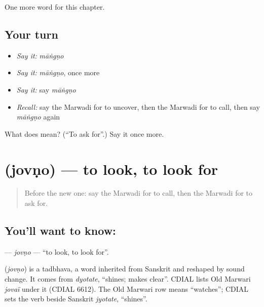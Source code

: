 \begin{grammarlens}[title={What you've built}]
One more word for this chapter.
\end{grammarlens}

\subsection*{Your turn}
\begin{itemize}
\raggedright
  \item \emph{Say it:} \emph{māṅgṇo}
  \item \emph{Say it:} \emph{māṅgṇo}, once more
  \item \emph{Say it:} say \emph{māṅgṇo}
  \item \emph{Recall:} say the Marwadi for to uncover, then the Marwadi for to call, then say \emph{māṅgṇo} again
\end{itemize}

\begin{tcolorbox}[breakable,colback=teal!4,colframe=teal!35!black,title={Before you move on}]
What does  mean? (\textquotedblleft{}To ask for\textquotedblright{}.) Say it once more.
\end{tcolorbox}
\section[\texorpdfstring{\mw{जोवणो} (jovṇo)}{जोवणो (jovṇo)}]{ (jovṇo) — to look, to look for}

\label{lesson:MW-C104-jovno}



\begin{quote}
Before the new one: say the Marwadi for to call, then the Marwadi for to ask for.
\end{quote}

\subsection*{You'll want to know: }
\textbf{} — \emph{jovṇo} — \textquotedblleft{}to look, to look for\textquotedblright{}.

\begin{cousinweb}
\textbf{} (\emph{jovṇo}) is a tadbhava, a word inherited from Sanskrit and reshaped by sound change. It comes from \emph{dyotate}, \textquotedblleft{}shines; makes clear\textquotedblright{}. CDIAL lists Old Marwari \emph{jovaï} under it (CDIAL 6612). The Old Marwari row means \textquotedblleft{}watches\textquotedblright{}; CDIAL sets the verb beside Sanskrit \emph{jyotate}, \textquotedblleft{}shines\textquotedblright{}.
\end{cousinweb}


